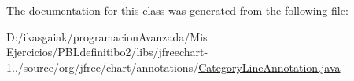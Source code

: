 The documentation for this class was generated from the following file\+:\begin{DoxyCompactItemize}
\item 
D\+:/ikasgaiak/programacion\+Avanzada/\+Mis Ejercicios/\+P\+B\+Ldefinitibo2/libs/jfreechart-\/1../source/org/jfree/chart/annotations/\mbox{\hyperlink{_category_line_annotation_8java}{Category\+Line\+Annotation.\+java}}\end{DoxyCompactItemize}
